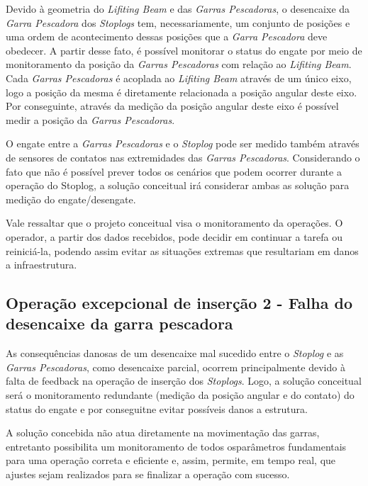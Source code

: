 Devido à geometria do \emph{Lifiting Beam} e das \emph{Garras Pescadoras}, o
desencaixe da \emph{Garra Pescadora} dos \emph{Stoplogs} tem, necessariamente,
um conjunto de posições e uma ordem de acontecimento dessas posições que a
\emph{Garra Pescadora} deve obedecer. A partir desse fato, é possível monitorar
o status do engate por meio de monitoramento da posição da \emph{Garras Pescadoras} com relação ao  \emph{Lifiting Beam}. 
Cada \emph{Garras Pescadoras} é acoplada ao \emph{Lifiting Beam} através de um único eixo, logo a posição da mesma é diretamente relacionada a posição angular deste eixo. Por conseguinte, através da medição da posição angular deste eixo é possível medir a posição da \emph{Garras Pescadoras}. 

O engate entre a \emph{Garras Pescadoras} e o \emph{Stoplog} pode ser medido também através de sensores de contatos nas extremidades das \emph{Garras Pescadoras}. 
Considerando o fato que não é possível prever todos os cenários que podem ocorrer durante a operação do Stoplog, a solução conceitual irá considerar ambas as solução para medição do engate/desengate.

Vale ressaltar que o projeto conceitual visa o monitoramento da operações. O
operador, a partir dos dados recebidos, pode decidir em continuar a tarefa ou
reiniciá-la, podendo assim evitar as situações extremas que resultariam em danos a infraestrutura. 


\subsection{Operação excepcional de inserção 2 - Falha do desencaixe da garra pescadora}
\label{op:sol:ins:1}

As consequências danosas de um desencaixe mal sucedido entre o \emph{Stoplog} e
as \emph{Garras Pescadoras}, como desencaixe parcial, ocorrem
principalmente devido à falta de feedback na operação de inserção dos \emph{Stoplogs}.
Logo, a solução conceitual será o monitoramento redundante (medição da posição angular e do contato) do status do engate e por conseguitne evitar possíveis danos a estrutura. 

A solução concebida não atua diretamente na movimentação das garras, entretanto possibilita um monitoramento de todos osparâmetros fundamentais para uma operação correta e eficiente e, assim,  
permite, em tempo real, que ajustes sejam realizados para se finalizar a
operação com sucesso. 

